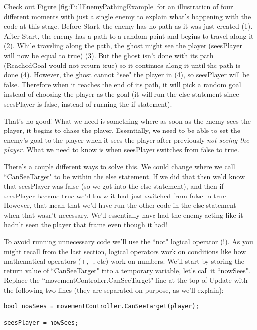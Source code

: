 \documentclass{article}
\begin{document}
Check out Figure \ref{fig:FullEnemyPathingExample} for an illustration of four different moments with just a single enemy to explain what's happening with the code at this stage. Before Start, the enemy has no path as it was just created (1). \newline
After Start, the enemy has a path to a random point and begins to travel along it (2). \newline
While traveling along the path, the ghost might see the player (seesPlayer will now be equal to true) (3). \newline
But the ghost isn't done with its path (ReachedGoal would not return true) so it continues along it until the path is done (4). \newline
However, the ghost cannot ``see" the player in (4), so seesPlayer will be false. Therefore when it reaches the end of its path, it will pick a random goal instead of choosing the player as the goal (it will run the else statement since seesPlayer is false, instead of running the if statement). 

That's no good! What we need is something where as soon as the enemy sees the player, it begins to chase the player. Essentially, we need to be able to set the enemy's goal to the player when it sees the player after previously \textit{not seeing the player}. What we need to know is when seesPlayer switches from false to true. 

There's a couple different ways to solve this. We could change where we call ``CanSeeTarget" to be within the else statement. If we did that then we'd know that seesPlayer was false (so we got into the else statement), and then if seesPlayer became true we'd know it had just switched from false to true. However, that mean that we'd have run the other code in the else statement when that wasn't necessary. We'd essentially have had the enemy acting like it hadn't seen the player that frame even though it had! 

To avoid running unnecessary code we'll use the ``not" logical operator (!). As you might recall from the last section, logical operators work on conditions like how mathematical operators (+, -, etc) work on numbers. We'll start by storing the return value of ``CanSeeTarget" into a temporary variable, let's call it ``nowSees". Replace the ``movementController.CanSeeTarget" line at the top of Update with the following two lines (they are separated on purpose, as we'll explain):

\lstset{style=sharpc}
\begin{lstlisting}
bool nowSees = movementController.CanSeeTarget(player);

seesPlayer = nowSees;
\end{lstlisting} 
\end{document}
